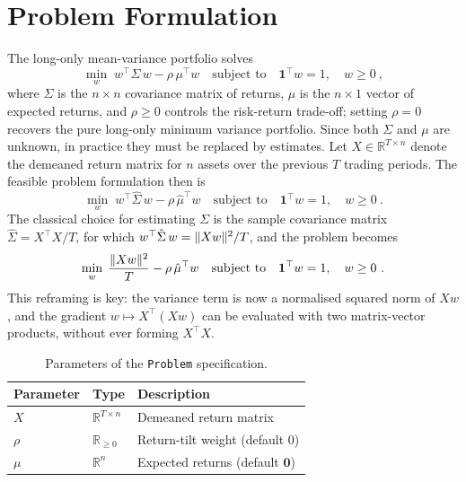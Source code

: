 \section{Problem Formulation}\label{sec:problem}
The long-only mean-variance portfolio solves
\[
\min_{w}\; w^\top\Sigma\, w - \rho\,\mu^\top w
\quad\text{subject to}\quad
\mathbf{1}^\top w = 1,\quad w\geq 0~,
\]
where $\Sigma$ is the $n\times n$ covariance matrix of returns, $\mu$ is the $n\times 1$ vector of expected returns, and $\rho\geq 0$ controls the risk-return trade-off; setting $\rho=0$ recovers the pure long-only minimum variance portfolio.
Since both $\Sigma$ and
$\mu$ are unknown, in practice they must be replaced by estimates. Let $X\in\mathbb{R}^{T\times n}$ denote the demeaned return matrix for $n$ assets over the previous $T$ trading periods. The feasible problem formulation then is
\[
\min_{w}\; w^\top\hat\Sigma\, w - \rho\,\hat\mu^\top w
\quad\text{subject to}\quad
\mathbf{1}^\top w = 1,\quad w\geq 0~.
\]
The classical choice for estimating $\Sigma$ is
the sample covariance matrix $\hat\Sigma = X^\top X/T$, for which $w^\top\hat\Sigma\, w = \lVert Xw \rVert^2/T$, and the problem becomes
\[
\min_{w}\;\frac{\lVert Xw \rVert^2}{T} - \rho\,\hat\mu^\top w
\quad\text{subject to}\quad
\mathbf{1}^\top w = 1,\quad w\geq 0~.
\]
This reframing is key: the variance term is now a normalised squared norm of $Xw$, and the gradient $w\mapsto X^\top(Xw)$ can be evaluated with two matrix-vector products, without ever forming $X^\top X$.

\begin{table}[ht]
\centering
\begin{tabular}{lll}
\toprule
Parameter & Type & Description \\
\midrule
$X$        & $\mathbb{R}^{T \times n}$ & Demeaned return matrix \\
$\rho$     & $\mathbb{R}_{\geq 0}$     & Return-tilt weight (default $0$) \\
$\mu$      & $\mathbb{R}^n$            & Expected returns (default $\mathbf{0}$) \\
\bottomrule
\end{tabular}
\caption{Parameters of the \texttt{Problem} specification.}
\label{tab:params}
\end{table}

